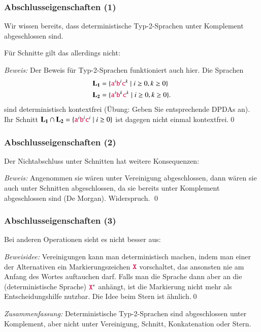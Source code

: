 \documentclass[aspectratio=1610,onlymath]{beamer}
\begin{document}
\begin{frame}\frametitle{Abschlusseigenschaften (1)}

Wir wissen bereits, dass deterministische Typ-2-Sprachen unter Komplement abgeschlossen sind.
\medskip\pause

Für Schnitte gilt das allerdings nicht:
\medskip

\pause

\emph{Beweis:} Der Beweis für Typ-2-Sprachen funktioniert auch hier.
Die Sprachen
\begin{align*}
\textbf{\textcolor{black}{L}}_{\textbf{\textcolor{black}{1}}}&= \{\mathtt{\textcolor{purple}{a}}^i\mathtt{\textcolor{purple}{b}}^i\mathtt{\textcolor{purple}{c}}^k\mid i\geq 0, k\geq 0\}\\
\textbf{\textcolor{black}{L}}_{\textbf{\textcolor{black}{2}}}&= \{\mathtt{\textcolor{purple}{a}}^i\mathtt{\textcolor{purple}{b}}^k\mathtt{\textcolor{purple}{c}}^k\mid i\geq 0, k\geq 0\}.
\end{align*}
sind deterministisch kontextfrei (Übung: Geben Sie entsprechende DPDAs an). Ihr Schnitt $\textbf{\textcolor{black}{L}}_{\textbf{\textcolor{black}{1}}}\cap\textbf{\textcolor{black}{L}}_{\textbf{\textcolor{black}{2}}}=\{\mathtt{\textcolor{purple}{a}}^i\mathtt{\textcolor{purple}{b}}^i\mathtt{\textcolor{purple}{c}}^i\mid i\geq 0\}$ ist dagegen nicht einmal kontextfrei.\qed

\end{frame}

\begin{frame}\frametitle{Abschlusseigenschaften (2)}

Der Nichtabschluss unter Schnitten hat weitere Konsequenzen:\medskip

\pause

\emph{Beweis:} Angenommen sie wären unter Vereinigung abgeschlossen, dann
wären sie auch unter Schnitten abgeschlossen, da sie bereits unter Komplement abgeschlossen sind (De Morgan).
Widerspruch.
\qed

\end{frame}

\begin{frame}\frametitle{Abschlusseigenschaften (3)}

Bei anderen Operationen sieht es nicht besser aus:\medskip

\pause

\emph{Beweisidee:} Vereinigungen kann man deterministisch machen, indem man einer der Alternativen ein Markierungszeichen $\mathtt{\textcolor{purple}{X}}$ vorschaltet, das ansonsten nie am Anfang des Wortes auftauchen darf. Falls man die Sprache dann aber an die (deterministische Sprache) $\mathtt{\textcolor{purple}{X}}^*$ anhängt, ist die Markierung nicht mehr als Entscheidungshilfe nutzbar.
Die Idee beim Stern ist ähnlich.\qed
\bigskip

\emph{Zusammenfassung:} Deterministische Typ-2-Sprachen sind 
abgeschlossen unter Komplement, aber nicht unter Vereinigung, Schnitt, Konkatenation oder Stern.

\end{frame}
\end{document}
